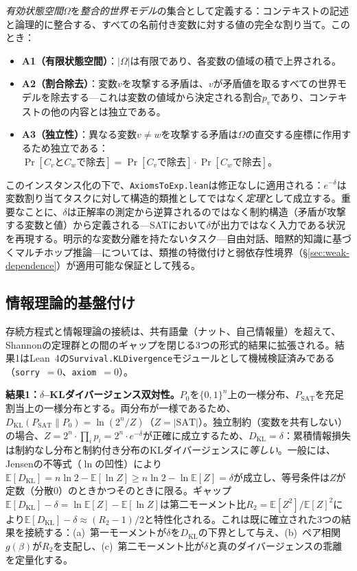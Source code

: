 \documentclass[11pt,a4paper]{article}
\begin{document}
\emph{有効状態空間}$\Omega$を\emph{整合的世界モデル}の集合として定義する：コンテキストの記述と論理的に整合する、すべての名前付き変数に対する値の完全な割り当て。このとき：
\begin{itemize}
  \item \textbf{A1（有限状態空間）}：$|\Omega|$は有限であり、各変数の値域の積で上界される。
  \item \textbf{A2（割合除去）}：変数$v$を攻撃する矛盾は、$v$が矛盾値を取るすべての世界モデルを除去する---これは変数の値域から決定される割合$p_v$であり、コンテキストの他の内容とは独立である。
  \item \textbf{A3（独立性）}：異なる変数$v \neq w$を攻撃する矛盾は$\Omega$の直交する座標に作用するため独立である：$\Pr[\text{$C_v$と$C_w$で除去}] = \Pr[\text{$C_v$で除去}]\cdot\Pr[\text{$C_w$で除去}]$。
\end{itemize}
このインスタンス化の下で、\texttt{AxiomsToExp.lean}は修正なしに適用される：$e^{-\delta}$は変数割り当てタスクに対して構造的類推としてではなく\emph{定理}として成立する。重要なことに、$\delta$は正解率の測定から逆算されるのではなく制約構造（矛盾が攻撃する変数と値）から定義される---SATにおいて$\delta$が出力ではなく入力である状況を再現する。明示的な変数分離を持たないタスク---自由対話、暗黙的知識に基づくマルチホップ推論---については、類推の特徴付けと弱依存性境界（\S\ref{sec:weak-dependence}）が適用可能な保証として残る。

\subsection{情報理論的基盤付け}
\label{sec:info-theory-grounding}

存続方程式と情報理論の接続は、共有語彙（ナット、自己情報量）を超えて、Shannonの定理群との間のギャップを閉じる3つの形式的結果に拡張される。結果1はLean~4の\texttt{Survival.KLDivergence}モジュールとして機械検証済みである（\texttt{sorry}~$= 0$、\texttt{axiom}~$= 0$）。

\textbf{結果1：$\delta$--KLダイバージェンス双対性。}$P_0$を$\{0,1\}^n$上の一様分布、$P_{\text{SAT}}$を充足割当上の一様分布とする。両分布が一様であるため、$D_{\text{KL}}(P_{\text{SAT}} \| P_0) = \ln(2^n / Z)$（$Z = |\text{SAT}|$）。独立制約（変数を共有しない）の場合、$Z = 2^n \cdot \prod_i p_i = 2^n \cdot e^{-\delta}$が正確に成立するため、$D_{\text{KL}} = \delta$：累積情報損失は制約なし分布と制約付き分布のKLダイバージェンスに\emph{等しい}。一般には、Jensenの不等式（$\ln$の凹性）により$\mathbb{E}[D_{\text{KL}}] = n \ln 2 - \mathbb{E}[\ln Z] \geq n \ln 2 - \ln \mathbb{E}[Z] = \delta$が成立し、等号条件は$Z$が定数（分散0）のときかつそのときに限る。ギャップ$\mathbb{E}[D_{\text{KL}}] - \delta = \ln \mathbb{E}[Z] - \mathbb{E}[\ln Z]$は第二モーメント比$R_2 = \mathbb{E}[Z^2]/\mathbb{E}[Z]^2$により$\mathbb{E}[D_{\text{KL}}] - \delta \approx (R_2 - 1)/2$と特性化される。これは既に確立された3つの結果を接続する：(a)~第一モーメントが$\delta$を$D_{\text{KL}}$の下界として与え、(b)~ペア相関$g(\beta)$が$R_2$を支配し、(c)~第二モーメント比が$\delta$と真のダイバージェンスの乖離を定量化する。
\end{document}
